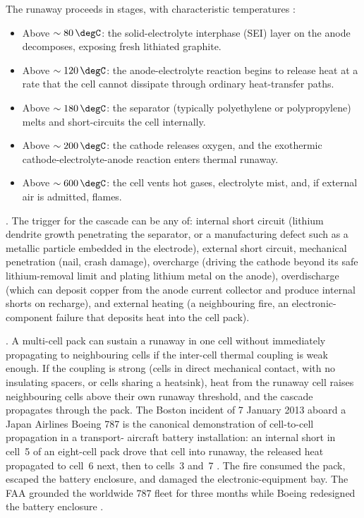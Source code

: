 The runaway proceeds in stages, with characteristic temperatures
\cite[pp.~71--75]{acc:ntsb-aar14-01-787-battery}:

\begin{itemize}[leftmargin=*]
\item Above $\sim 80\,\degC$: the solid-electrolyte interphase (SEI)
  layer on the anode decomposes, exposing fresh lithiated graphite.
\item Above $\sim 120\,\degC$: the anode-electrolyte reaction begins
  to release heat at a rate that the cell cannot dissipate through
  ordinary heat-transfer paths.
\item Above $\sim 180\,\degC$: the separator (typically polyethylene
  or polypropylene) melts and short-circuits the cell internally.
\item Above $\sim 200\,\degC$: the cathode releases oxygen, and the
  exothermic cathode-electrolyte-anode reaction enters thermal runaway.
\item Above $\sim 600\,\degC$: the cell vents hot gases, electrolyte
  mist, and, if external air is admitted, flames.
\end{itemize}

. The trigger for the cascade can be any
of: internal short circuit (lithium dendrite growth penetrating the
separator, or a manufacturing defect such as a metallic particle
embedded in the electrode), external short circuit, mechanical
penetration (nail, crash damage), overcharge (driving the cathode
beyond its safe lithium-removal limit and plating lithium metal on the
anode), overdischarge (which can deposit copper from the anode current
collector and produce internal shorts on recharge), and external
heating (a neighbouring fire, an electronic-component failure that
deposits heat into the cell pack).

. A multi-cell pack can sustain a
runaway in one cell without immediately propagating to neighbouring
cells if the inter-cell thermal coupling is weak enough. If the
coupling is strong (cells in direct mechanical contact, with no
insulating spacers, or cells sharing a heatsink), heat from the
runaway cell raises neighbouring cells above their own runaway
threshold, and the cascade propagates through the pack. The Boston
incident of 7 January 2013 aboard a Japan Airlines Boeing 787 is the
canonical demonstration of cell-to-cell propagation in a transport-
aircraft battery installation: an internal short in cell~5 of an
eight-cell pack drove that cell into runaway, the released heat
propagated to cell~6 next, then to cells~3 and~7
\cite[pp.~98--104]{acc:ntsb-aar14-01-787-battery}. The fire consumed
the pack, escaped the battery enclosure, and damaged the
electronic-equipment bay. The FAA grounded the worldwide 787 fleet for
three months while Boeing redesigned the battery enclosure
\cite[pp.~2, 60]{acc:ntsb-aar14-01-787-battery}.

